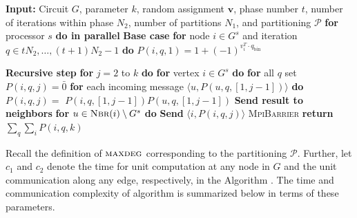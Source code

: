 \begin{algorithm}{}
\small
\caption{}
\label{alg:parEvaluate} 
\begin{algorithmic}[1]
\STATE \textbf{Input:} Circuit $G$, parameter $k$, random assignment $\mathbf{v}$, phase number $t$, number of iterations within phase $N_2$, number of partitions $N_1$, and partitioning $\mathcal{P}$
\STATE
\STATE \textbf{for} processor $s$ \textbf{do in parallel}
\STATE \quad \textbf{Base case}
\STATE \quad \textbf{for} node $i \in G^s$ and iteration $q \in tN_2,\ldots,(t+1)N_2-1$ \textbf{do}
\STATE \qquad $ P(i, q, 1) = 1 + (-1)^{v_i^T \cdot q_{\text{bin}}}$

\STATE \quad \textbf{Recursive step}
\STATE \quad \textbf{for} $j=2$ to $k$ \textbf{do}
\STATE \qquad \textbf{for} vertex $i \in G^s$ \textbf{do}
\STATE \qquad \quad \textbf{for} all $q$ set $P(i,q,  j) = \bar 0$
\STATE \qquad \quad \textbf{for} each incoming message $\langle u, P(u, q, [1, j-1])\rangle$ \textbf{do}
\STATE \qquad \qquad $P(i, q, j)=$ $P(i, q, [1, j-1])  P(u, q, [1, j-1])$
\STATE \qquad \quad  \textbf{Send result to neighbors}
\STATE \qquad \quad \textbf{for} $u \in \textsc{Nbr}(i)\setminus G^s$ \textbf{do}
\STATE \qquad \qquad \textbf{Send} $\langle i, P(i, q, j)\rangle$
\STATE \textsc{MpiBarrier}
\STATE \textbf{return} $\sum_q \sum_i P(i, q, k)$
\end{algorithmic}
\end{algorithm}

Recall the definition of $\textsc{maxdeg}{}$ corresponding to the partitioning $\mathcal{P}$.
Further, let $c_1$ and $c_2$ denote the time for unit computation at any node in $G$
and the unit communication along any edge, respectively, in the Algorithm \parcircuit{}.
The time and communication complexity of algorithm \parmaxwt{} is summarized below
in terms of these parameters. 

